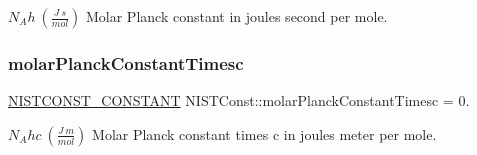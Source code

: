 $N_A h \ (\frac{J\ s}{mol})$ Molar Planck constant in joules second per mole. \mbox{\label{group___n_i_s_t_const-_molar_planck_constant_ga79708a6d196bdd250c5e965eb857a786}} 
\subsubsection{\texorpdfstring{molar\+Planck\+Constant\+Timesc}{molarPlanckConstantTimesc}}
{\footnotesize\ttfamily \mbox{\hyperlink{group___n_i_s_t_const-_macros_ga2b0fc1d7452373f816175dd86ce26729}{N\+I\+S\+T\+C\+O\+N\+S\+T\+\_\+\+C\+O\+N\+S\+T\+A\+NT}} N\+I\+S\+T\+Const\+::molar\+Planck\+Constant\+Timesc = 0.}

$N_A hc \ (\frac{J\ m}{mol})$ Molar Planck constant times c in joules meter per mole. 